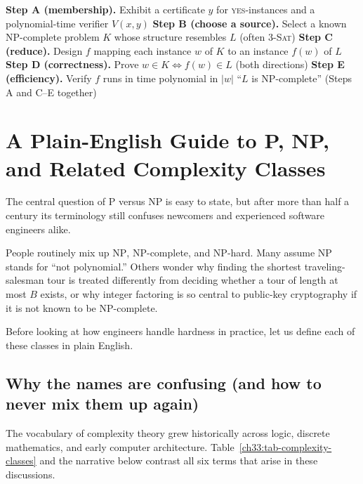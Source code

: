 \begin{algorithm}[H]
\caption{Generic NP-completeness proof template}
\textbf{Step A (membership).} Exhibit a certificate $y$ for \textsc{yes}-instances
and a polynomial-time verifier $V(x,y)$\;
\textbf{Step B (choose a source).} Select a known NP-complete problem $K$ whose
structure resembles $L$ (often \textsc{3-Sat})\;
\textbf{Step C (reduce).} Design $f$ mapping each instance $w$ of $K$ to an
instance $f(w)$ of $L$\;
\textbf{Step D (correctness).} Prove $w\in K \iff f(w)\in L$ (both directions)\;
\textbf{Step E (efficiency).} Verify $f$ runs in time polynomial in $|w|$\;
\Return ``$L$ is NP-complete'' (Steps A and C--E together)\;
\end{algorithm}

\section{A Plain-English Guide to P, NP, and Related Complexity Classes}
\label{ch33:demystifying-p-np}

The central question of $\mathrm{P}$ versus $\mathrm{NP}$ is easy to state, but after more than half a century its terminology still confuses newcomers and experienced software engineers alike.

People routinely mix up $\mathrm{NP}$, $\mathrm{NP}$-complete, and $\mathrm{NP}$-hard. Many assume $\mathrm{NP}$ stands for ``not polynomial.'' Others wonder why finding the shortest traveling-salesman tour is treated differently from deciding whether a tour of length at most $B$ exists, or why integer factoring is so central to public-key cryptography if it is not known to be $\mathrm{NP}$-complete.

Before looking at how engineers handle hardness in practice, let us define each of these classes in plain English.

\subsection{Why the names are confusing (and how to never mix them up again)}

The vocabulary of complexity theory grew historically across logic, discrete mathematics, and early computer architecture. Table~\ref{ch33:tab-complexity-classes} and the narrative below contrast all six terms that arise in these discussions.

